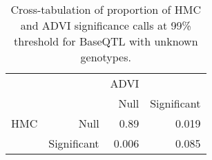 \begin{table}[ht]
\centering
\begin{tabular}{rr|rr}
   &  & ADVI &  \\ 
    &   & Null & Significant \\ 
   \hline
HMC & Null & 0.89 & 0.019 \\ 
    & Significant & 0.006 & 0.085 \\ 
  \end{tabular}
\caption{Cross-tabulation of proportion of HMC and ADVI significance calls at 99\% threshold for BaseQTL with unknown genotypes.} 
\label{tab:nogt-xtab-prop-99}
\end{table}
